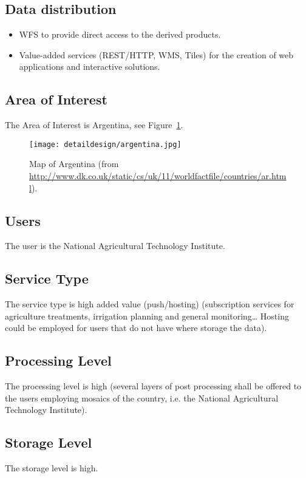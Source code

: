 \subsection{Data distribution}
\begin{itemize}
\item \ac{WFS} to provide direct access to the derived products.
\item Value-added services (REST/HTTP, WMS, Tiles) for the creation of web
  applications and interactive solutions. 
\end{itemize}

\subsection{Area of Interest} 
The Area of Interest is Argentina, see Figure~\ref{fig:argentina}.

  \begin{figure}[!h]
\begin{center}
\texttt{[image: detaildesign/argentina.jpg]}
\caption[Map of Argentina]{Map of Argentina (from \url{http://www.dk.co.uk/static/cs/uk/11/worldfactfile/countries/ar.html}).}
\label{fig:argentina}
\end{center}
\end{figure}

\subsection{Users}
The user is the National Agricultural Technology Institute.
\subsection{Service Type}
The service type is high added value (push/hosting) (subscription services for agriculture treatments, irrigation planning and general monitoring… Hosting could be employed for users that do not have where storage the data).
\subsection{Processing Level}
The processing level is high (several layers of post processing shall be offered to the users employing mosaics of the country, i.e. the National Agricultural Technology Institute).
\subsection{Storage Level}
The storage level is high. 
